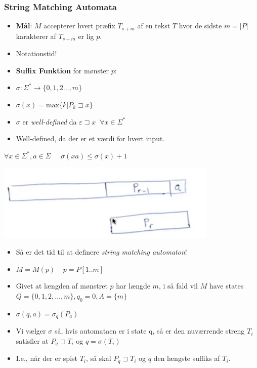 \documentclass{beamer}
\begin{document}
\begin{frame}[allowframebreaks]
  \frametitle{String Matching Automata}
  \begin{itemize}
  \item \textbf{Mål}: $M$ accepterer hvert præfix $T_{s+m}$ af en tekst $T$ hvor de sidste $m = |P|$ karakterer af $T_{s+m}$ er lig $p$.
  \item Notationstid!
  \item \textbf{Suffix Funktion} for mønster $p$:
  \item $\sigma : \Sigma^{*} \rightarrow \{ 0,1,2 \ldots, m \} $
  \item $\sigma(x) = \text{max}\{k | P_{k} \sqsupset x\}$
  \item $\sigma$ er \textit{well-defined} da $\varepsilon \sqsupset x\;\; \forall x \in \Sigma^{*}$
  \item Well-defined, da der er et værdi for hvert input.
  \end{itemize}
  \begin{lemma}[32.2]
$\forall x \in \Sigma^{*}, a \in \Sigma \;\;\;\;\; \sigma(xa) \leq \sigma(x)+1$
  \end{lemma}
  \includegraphics[width=300pt]{main--the-naive-string-matching-algorithm--string-matching-with-dfa's-6ee3.png}
  \begin{itemize}
  \item Så er det tid til at definere \textit{string matching automaton}!
  \item $M = M(p)\;\;\;\;p=P[1..m]$
  \item Givet at længden af mønstret $p$ har længde $m$, i så fald vil $M$ have states $Q = \{0, 1, 2, \ldots, m\}, q_{0} = 0, A = \{m\}$
  \item $\sigma (q,a) = \sigma_{q}(P_{a})$
  \item Vi vælger $\sigma$ så, hvis automataen er i state q, så er den nuværrende streng $T_{i}$ satisfier at $P_{q} \sqsupset T_{i}$ og $q = \sigma(T_{i})$
  \item I.e., når der er spist $T_{i}$, så skal $P_q \sqsupset T_{i}$ og $q$ den længste suffiks af $T_{i}$.
  \end{itemize}
\end{frame}
\end{document}
